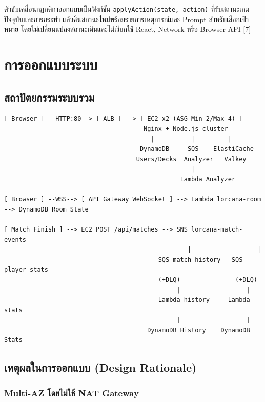 \documentclass[12pt,a4paper]{report}
\begin{document}
ตัวขับเคลื่อนกฎกติกาออกแบบเป็นฟังก์ชัน \texttt{applyAction(state, action)} ที่รับสถานะเกมปัจจุบันและการกระทำ แล้วคืนสถานะใหม่พร้อมรายการเหตุการณ์และ Prompt สำหรับเลือกเป้าหมาย โดยไม่เปลี่ยนแปลงสถานะเดิมและไม่เรียกใช้ React, Network หรือ Browser API [7]

\chapter{การออกแบบระบบ}

\section{สถาปัตยกรรมระบบรวม}

\begin{lstlisting}[caption={แผนภาพสถาปัตยกรรมระบบ Disney Lorcana PlayLab Cloud (Stage 3)}]
[ Browser ] --HTTP:80--> [ ALB ] --> [ EC2 x2 (ASG Min 2/Max 4) ]
                                      Nginx + Node.js cluster
                                        |          |         |
                                     DynamoDB     SQS    ElastiCache
                                    Users/Decks  Analyzer   Valkey
                                                   |
                                                Lambda Analyzer

[ Browser ] --WSS--> [ API Gateway WebSocket ] --> Lambda lorcana-room --> DynamoDB Room State

[ Match Finish ] --> EC2 POST /api/matches --> SNS lorcana-match-events
                                                  |                  |
                                          SQS match-history   SQS player-stats
                                          (+DLQ)               (+DLQ)
                                               |                  |
                                          Lambda history     Lambda stats
                                               |                  |
                                       DynamoDB History    DynamoDB Stats
\end{lstlisting}

\section{เหตุผลในการออกแบบ (Design Rationale)}

\subsection{Multi-AZ โดยไม่ใช้ NAT Gateway}
\end{document}
